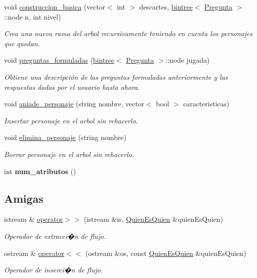 \begin{DoxyCompactItemize}
void \hyperlink{classQuienEsQuien_a3209af5840851a10f2a1b20d52ea6442}{construccion\+\_\+basica} (vector$<$ int $>$ descartes, \hyperlink{classbintree}{bintree}$<$ \hyperlink{classPregunta}{Pregunta} $>$\+::node n, int nivel)
\begin{DoxyCompactList}\small\item\em Crea una nueva rama del arbol recursivamente teniendo en cuenta los personajes que quedan. \end{DoxyCompactList}\item 
void \hyperlink{classQuienEsQuien_adcb666b01429a92009d1991bb07379e1}{preguntas\+\_\+formuladas} (\hyperlink{classbintree}{bintree}$<$ \hyperlink{classPregunta}{Pregunta} $>$\+::node jugada)
\begin{DoxyCompactList}\small\item\em Obtiene una descripción de las preguntas formuladas anteriormente y las respuestas dadas por el usuario hasta ahora. \end{DoxyCompactList}\item 
void \hyperlink{classQuienEsQuien_ab2ded22e1d06ccb7c608ea1d7e3061d7}{aniade\+\_\+personaje} (string nombre, vector$<$ bool $>$ caracteristicas)
\begin{DoxyCompactList}\small\item\em Insertar personaje en el arbol sin rehacerlo. \end{DoxyCompactList}\item 
void \hyperlink{classQuienEsQuien_ada5ff48eb2a12ddd07f11a01d2324982}{elimina\+\_\+personaje} (string nombre)
\begin{DoxyCompactList}\small\item\em Borrar personaje en el arbol sin rehacerlo. \end{DoxyCompactList}\item 
int {\bfseries num\+\_\+atributos} ()\hypertarget{classQuienEsQuien_a4a73ebe2ffc4581b157851f51ee9b284}{}\label{classQuienEsQuien_a4a73ebe2ffc4581b157851f51ee9b284}

\end{DoxyCompactItemize}
\subsection*{Amigas}
\begin{DoxyCompactItemize}
\item 
istream \& \hyperlink{classQuienEsQuien_a2d1e36c1b1d93621e8544d645cfff44c}{operator$>$$>$} (istream \&is, \hyperlink{classQuienEsQuien}{Quien\+Es\+Quien} \&quien\+Es\+Quien)
\begin{DoxyCompactList}\small\item\em Operador de extracci�n de flujo. \end{DoxyCompactList}\item 
ostream \& \hyperlink{classQuienEsQuien_a0fd056740c595bda2964d68dc262a639}{operator$<$$<$} (ostream \&os, const \hyperlink{classQuienEsQuien}{Quien\+Es\+Quien} \&quien\+Es\+Quien)
\begin{DoxyCompactList}\small\item\em Operador de inserci�n de flujo. \end{DoxyCompactList}\end{DoxyCompactItemize}



